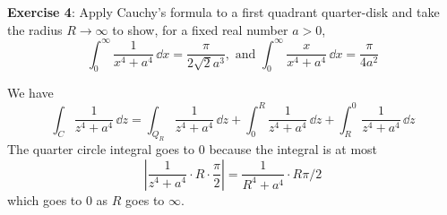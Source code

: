 \documentclass{article}
\begin{document}
\textbf{Exercise 4}: Apply Cauchy's formula to a first quadrant quarter-disk and take the radius $R \rightarrow \infty$ to show, for a fixed real number $a > 0$,
    \begin{equation*}
        \int_{0}^{\infty} \dfrac{1}{x^{4} + a^{4}} \, \dd{x}  = \dfrac{\pi}{2\sqrt{2}a^{3}}, \text{ and } \int_{0}^{\infty} \dfrac{x}{x^{4} + a^{4}} \, \dd{x} = \dfrac{\pi}{4a^{2}}
    \end{equation*}
        \begin{answer}
            We have
                \begin{equation*}
                    \int_{C}^{} \dfrac{1}{z^{4} + a^{4}} \, \dd{z} = \int_{Q_{R}}^{} \dfrac{1}{z^{4} + a^{4}} \, \dd{z}  + \int_{0}^{R} \dfrac{1}{z^{4} + a^{4}} \, \dd{z} + \int_{R}^{0} \dfrac{1}{z^{4} + a^{4}} \, \dd{z} 
                \end{equation*}
            The quarter circle integral goes to $0$ because the integral is at most 
                \begin{equation*}
                    \left\lvert \dfrac{1}{z^{4} + a^{4}} \cdot R \cdot \dfrac{\pi}{2} \right\rvert = \dfrac{1}{R^{4} + a^{4}} \cdot R\pi / 2
                \end{equation*}
            which goes to $0$ as $R$ goes to $\infty$.


\end{answer}
\end{document}
